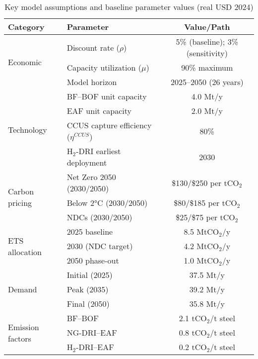 \begin{table}[ht]
  \centering
  \caption{Key model assumptions and baseline parameter values (real USD 2024)}
  \label{tab:assumptions}
  \begin{threeparttable}
  \begin{tabular}{@{}llc@{}}
    \toprule
    Category & Parameter & Value/Path \\
    \midrule
    \multirow{3}{*}{Economic} & Discount rate ($\rho$) & 5\% (baseline); 3\% (sensitivity) \\
    & Capacity utilization ($\mu$) & 90\% maximum \\
    & Model horizon & 2025--2050 (26 years) \\
    \midrule
    \multirow{4}{*}{Technology} & BF--BOF unit capacity & 4.0 Mt/y \\
    & EAF unit capacity & 2.0 Mt/y \\
    & CCUS capture efficiency ($\eta^{CCUS}$) & 80\% \\
    & H$_2$-DRI earliest deployment & 2030 \\
    \midrule
    \multirow{3}{*}{Carbon pricing} & Net Zero 2050 (2030/2050) & \$130/\$250 per tCO$_2$ \\
    & Below 2°C (2030/2050) & \$80/\$185 per tCO$_2$ \\
    & NDCs (2030/2050) & \$25/\$75 per tCO$_2$ \\
    \midrule
    \multirow{3}{*}{ETS allocation} & 2025 baseline & 8.5 MtCO$_2$/y \\
    & 2030 (NDC target) & 4.2 MtCO$_2$/y \\
    & 2050 phase-out & 1.0 MtCO$_2$/y \\
    \midrule
    \multirow{3}{*}{Demand} & Initial (2025) & 37.5 Mt/y \\
    & Peak (2035) & 39.2 Mt/y \\
    & Final (2050) & 35.8 Mt/y \\
    \midrule
    \multirow{3}{*}{Emission factors} & BF--BOF & 2.1 tCO$_2$/t steel \\
    & NG-DRI--EAF & 0.8 tCO$_2$/t steel \\
    & H$_2$-DRI--EAF & 0.2 tCO$_2$/t steel \\
    \bottomrule
  \end{tabular}
  \end{threeparttable}
\end{table}